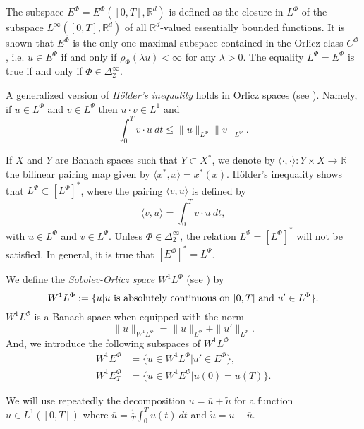 \documentclass[twoside]{article}
\theoremstyle{remark}
\newcommand{\orlnor}{\|_{L^{\Phi}}}
\newcommand{\lphi}{L^{\Phi}}
\newcommand{\lpsi}{L^{\Psi}}
\newcommand{\ephi}{E^{\Phi}}
\newcommand{\claseor}{C^{\Phi}}
\newcommand{\wphi}{W^{1}\lphi}
\newcommand{\wphie}{W^{1}\ephi}
\newcommand{\rr}{\mathbb{R}}
\renewcommand{\leq}{\leqslant}
\begin{document}
The subspace $\ephi=\ephi([0,T],\rr^d)$ is defined as the closure in $\lphi$ of the subspace $L^{\infty}([0,T],\rr^d)$ of all $\mathbb{R}^d$-valued essentially bounded functions. It is shown that  $\ephi$ is the only one maximal subspace contained in the Orlicz class $\claseor$, i.e.
$u\in\ephi$ if and only if $\rho_{\Phi}(\lambda u)<\infty$ for any $\lambda>0$. The equality $\lphi=\ephi$ is true if and only if $\Phi\in\Delta_2^{\infty}$.

A generalized version of \emph{H\"older's inequality} holds in Orlicz spaces (see \cite[Thm. 9.3]{KR}). Namely, if $u\in\lphi$ and $v\in\lpsi$ then $u\cdot v\in L^1$ and
\begin{equation}\label{holder}
\int_0^Tv\cdot u\ dt\leq \|u\orlnor\|v\|_{L^{\Psi}}.
\end{equation}




If $X$ and $Y$ are  Banach spaces such that  $Y\subset X^*$, we denote by $\langle\cdot,\cdot\rangle:Y\times X\to\mathbb{R}$ the bilinear pairing  map given by $\langle x^*,x\rangle=x^*(x)$. H\"older's inequality shows that $\lpsi\subset \left[\lphi\right]^*$, where the pairing
$\langle v, u\rangle$
is defined by 
\begin{equation}\label{pairing}
  \langle v,u\rangle=\int_0^Tv\cdot u\ dt,
\end{equation}
with  $u\in\lphi$ and $v\in\lpsi$.
 Unless $\Phi \in \Delta_2^{\infty}$, the relation $\lpsi= \left[\lphi\right]^*$ will not be satisfied. 
In general, it is true  that  $\left[\ephi\right]^*=\lpsi$.



We define the \emph{Sobolev-Orlicz space} $\wphi$ (see \cite{adams_sobolev}) by
\[\wphi:=\{u| u \hbox{ is absolutely continuous on $[0,T]$ and } u'\in \lphi\}.\]
$\wphi$ is a Banach space when equipped with the norm
\begin{equation}\label{def-norma-orlicz-sob}
\|  u  \|_{\wphi}= \|  u  \|_{\lphi} + \|u'\orlnor.
\end{equation}
And, we introduce the following subspaces of $\wphi$
\begin{equation}\label{def-esp-orlicz-sob-per}
\begin{split}
\wphie&=\{u\in\wphi|u'\in\ephi\},\\
\wphie_T&=\{u\in\wphie|u(0)=u(T)\}.
\end{split}
\end{equation}



We will use repeatedly the decomposition $u=\overline{u}+\widetilde{u}$ for a function $u\in L^1([0,T])$  where $\overline{u} =\frac1T\int_0^T u(t)\ dt$ and $\widetilde{u}=u-\overline{u}$.
\end{document}
